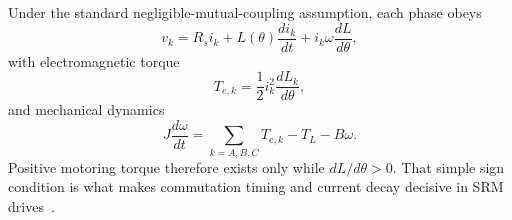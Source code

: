 \documentclass[conference]{IEEEtran}
\begin{document}
Under the standard negligible-mutual-coupling assumption, each phase obeys
\begin{equation}
v_k = R_s i_k + L(\theta)\frac{di_k}{dt} + i_k \omega \frac{dL}{d\theta},
\label{eq:phase_voltage}
\end{equation}
with electromagnetic torque
\begin{equation}
T_{e,k} = \frac{1}{2} i_k^2 \frac{dL_k}{d\theta},
\label{eq:phase_torque}
\end{equation}
and mechanical dynamics
\begin{equation}
J\frac{d\omega}{dt} = \sum_{k=A,B,C} T_{e,k} - T_L - B\omega.
\label{eq:mechanical}
\end{equation}
Positive motoring torque therefore exists only while $dL/d\theta > 0$.
That simple sign condition is what makes commutation timing and current decay decisive in SRM drives~\cite{Miller1993,Krishnan2001}.
\end{document}
